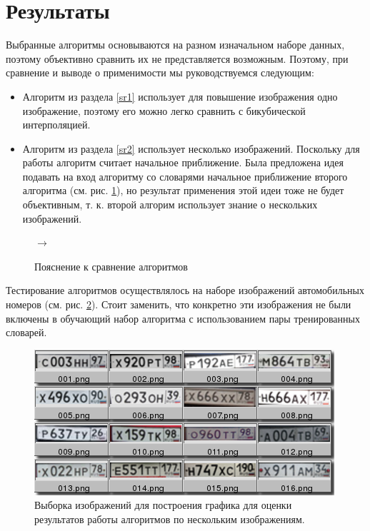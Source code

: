 \section{Результаты}
 Выбранные алгоритмы основываются на разном изначальном наборе данных, поэтому объективно сравнить их не представляется
 возможным. Поэтому, при сравнение и выводе о применимости мы руководствуемся следующим:
 \begin{itemize}
   \item Алгоритм из раздела \ref{sr1} использует для повышение изображения одно изображение, поэтому  его можно легко
     сравнить с бикубической интерполяцией.
   \item Алгоритм из раздела \ref{sr2} использует несколько изображений. Поскольку для работы алгоритм считает начальное
     приближение. Была предложена идея подавать на вход алгоритму со словарями начальное приближение второго алгоритма (см. рис.
     \ref{fig:compare}), но результат применения этой идеи тоже не будет объективным, т. к. второй алгорим использует знание о
     нескольких изображений.
 \end{itemize}

\begin{figure}[h]
  \centering
  \newcommand{\inimage}[2]{
    \begin{minipage}{#1}
      \vcenter{\texttt{[image: \#2]}}
    \end{minipage}
  }
  \inimage{3cm}{../presentation/content/append_imgs_big.jpg}
  $\to$
  \inimage{6cm}{../presentation/content/combined_big.jpg}
  \caption{Пояснение к сравнение алгоритмов}
  \label{fig:compare}
\end{figure}

Тестирование алгоритмов осуществлялось на наборе изображений автомобильных номеров (см. рис. \ref{fig:samples}). Стоит заменить, что конкретно эти
изображения не были включены в обучающий набор алгоритма с использованием пары тренированных словарей.

\begin{figure}[h]
  \begin{center}
    \includegraphics{../presentation/content/out_sr1.png}
  \end{center}
  \caption{Выборка изображений для построения графика для оценки результатов работы алгоритмов по нескольким
  изображениям.}
  \label{fig:samples}
\end{figure}

